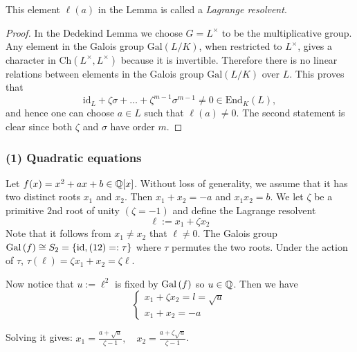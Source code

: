 \documentclass[twoside = false,	%
		headsepline,		%
		parskip = true,
		]{scrbook}						%
\begin{document}
{    This element $\ell(a)$ in the Lemma is called a \emph{Lagrange resolvent}.

    \begin{proof}
        In the Dedekind Lemma we choose $G=L^\times$ to be the multiplicative group. Any element in the Galois group $\mathrm{Gal}(L/K)$, when restricted to $L^\times$, gives a character in $\mathrm{Ch}(L^\times,L^\times)$ because it is invertible. Therefore there is no linear relations between elements in the Galois group $\mathrm{Gal}(L/K)$ over $L$. This proves that $$\mathrm{id}_L+\zeta\sigma+\ldots+\zeta^{m-1}\sigma^{m-1}\neq 0\in \mathrm{End}_K(L),$$
        and hence one can choose $a\in L$ such that $\ell(a)\neq 0$. The second statement is clear since both $\zeta$ and $\sigma$ have order $m$.
    \end{proof}}

        \subsubsection{(1) Quadratic equations} 
            Let $f(x) = x^2 + ax + b \in \mathbb Q[x]$. Without loss of generality, we assume that it has two distinct roots $x_1$ and $x_2$. Then $x_1 + x_2 = -a$ and $x_1x_2 = b$. We let $\zeta$ be a primitive $2$nd root of unity $(\zeta = -1)$ and define the Lagrange resolvent
            \begin{equation*}
                \ell := x_1 + \zeta x_2
            \end{equation*}
            {\color{blue} Note that it follows from $x_1\neq x_2$ that $\ell\neq 0$.}
            The Galois group $\mathrm{Gal}\left( f\right) \cong S_2 = \{\mathrm{id}, (12)=: \tau \}$ where $\tau$ permutes the two roots. Under the action of $\tau$, $\tau(\ell) = \zeta x_1 + x_2 = \zeta \ell$.
            
            Now notice that $u:= \ell^2$ is fixed by $\mathrm{Gal}\left( f\right)$ so $u \in \mathbb Q$. Then we have
            \begin{equation*}
                \left\{ \begin{array}{c}
                    x_1 + \zeta x_2 = l = \sqrt{u}  \\
                    x_1 + x_2 = -a
                \end{array}\right.
            \end{equation*}
            
            Solving it gives: $x_1 = \frac{a + \sqrt{u}}{\zeta - 1}, \quad x_2 = \frac{a +\zeta \sqrt{u}}{\zeta - 1}$.
            
\end{document}
